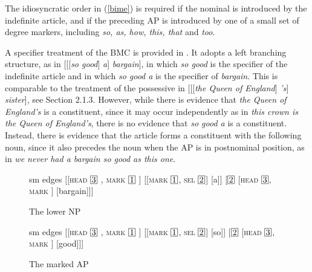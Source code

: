 \documentclass[output=paper
                ,modfonts
                ,nonflat
	        ,collection
	        ,collectionchapter
	        ,collectiontoclongg
 	        ,biblatex
                ,babelshorthands
                ,newtxmath
                ,draftmode
                ,colorlinks, citecolor=brown
]{./langsci/langscibook}
\begin{document}
\noindent
The idiosyncratic order in (\ref{bime}) is required if the nominal is introduced 
by the indefinite article, and if the preceding AP is introduced by one of a small 
set of degree markers, including \emph{so, as, how, this, that} and \emph{too}. 

A specifier treatment of the BMC is provided in \citet[201]{GS00}. It adopts  
a left branching structure, as in  [[[\emph{so good}] \emph{a}] \emph{bargain}], 
in which \emph{so good} is the specifier of the indefinite article and in which 
\emph{so good a} is the specifier of \emph{bargain}. This is comparable to the 
treatment of the possessive in [[[\emph{the Queen of England}] \emph{'s}] \emph{sister}],
see Section 2.1.3.  
However, while there is evidence that \emph{the Queen of England's} is a constituent,
since it may occur independently as in \emph{this crown is the Queen of England's}, there is 
no evidence that \emph{so good a} is a constituent. Instead, there is evidence that 
the article forms a constituent with the following noun, since it also precedes the noun 
when the AP is in postnominal position, as in \emph{we never had a bargain so good as this one}.

\begin{figure}
	\centering
	\begin{forest}
sm edges
[{[\textsc{head} $\avmbox{3}$ , \textsc{mark} $\avmbox{1}$ ]}
		[{[\textsc{mark} $\avmbox{1}$, \textsc{sel} $\avmbox{2}$]} [a]]
		[{$\avmbox{2}$ [\textsc{head} $\avmbox{3}$, \textsc{mark} ]} [bargain]]]
	\end{forest}
	\caption{\label{aprob} The lower NP }
\end{figure}

\begin{figure}
	\centering
	\begin{forest}
sm edges
[{[\textsc{head} $\avmbox{3}$ , \textsc{mark} $\avmbox{1}$ ]}
		[{[\textsc{mark} $\avmbox{1}$, \textsc{sel} $\avmbox{2}$]} [so]]
		[{$\avmbox{2}$ [\textsc{head} $\avmbox{3}$, \textsc{mark} ]} [good]]]
	\end{forest}
	\caption{\label{sohow} The marked AP }
\end{figure}
\end{document}
